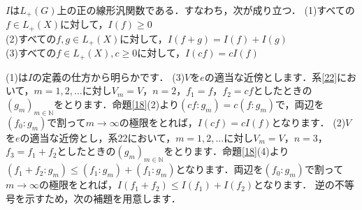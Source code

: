 \begin{prop}\label{23}
$I$は$L_{+}(G)$上の正の線形汎関数である．すなわち，次が成り立つ．
(1)すべての$f \in L_{+}(X)$に対して，$I(f) \ge 0$\\
(2)すべての$f,g \in L_{+}(X)$に対して，$I(f+g)=I(f)+I(g)$\\
(3)すべての$f \in L_{+}(X), c \ge 0$に対して，$I(cf)=cI(f)$\\
\end{prop}
\begin{Proof}
(1)は$I$の定義の仕方から明らかです．
(3)$V$を$e$の適当な近傍とします．系\ref{22}において，$m=1,2,\ldots$に対し$V_m=V$，$n=2$，$f_1=f$，$f_2=cf$としたときの$(g_m)_{m \in \mathbb{N}}$をとります．命題\ref{18}(2)より$(cf \colon g_m)=c(f \colon g_m)$で，両辺を$(f_0 \colon g_m)$で割って$m \to \infty$の極限をとれば，$I(cf)=cI(f)$となります．
(2)$V$を$e$の適当な近傍とし，系22において，$m=1,2,\ldots$に対し$V_m=V$，$n=3$，$f_3=f_1+f_2$としたときの$(g_m)_{m \in \mathbb{N}}$をとります．命題\ref{18}(4)より$(f_{1}+f_{2} \colon g_m ) \le (f_1 \colon g_m )+(f_1 \colon g_m)$となります．両辺を$(f_0 \colon g_m)$で割って$m \to \infty$の極限をとれば，$I(f_1+f_2) \le I(f_1)+I(f_2)$となります．
逆の不等号を示すため，次の補題を用意します．


\end{Proof}
